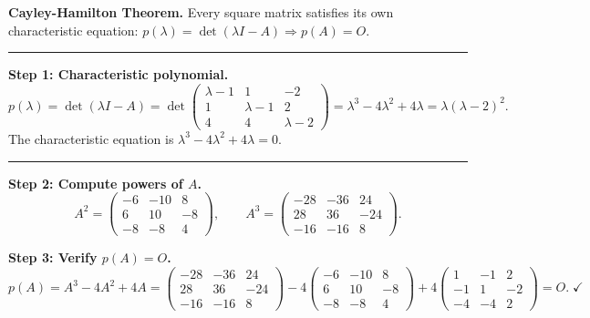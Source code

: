 \documentclass[12pt,a3paper]{article}
\begin{document}
\begin{tcolorbox}[enhanced,breakable,
  colback=cE!4,colframe=cE,boxrule=0.8pt,arc=5pt,
  title={\textbf{Answer --- Cayley-Hamilton for
    $A=\begin{pmatrix}1&-1&2\\-1&1&-2\\-4&-4&2\end{pmatrix}$}},
  fonttitle=\bfseries\color{white},colbacktitle=cE]

\textbf{Cayley-Hamilton Theorem.}
Every square matrix satisfies its own characteristic equation:
$p(\lambda) = \det(\lambda I - A) \Rightarrow p(A) = O$.

\medskip\textcolor{cE}{\rule{\textwidth}{0.4pt}}

\textbf{Step 1: Characteristic polynomial.}
\[
  p(\lambda) = \det(\lambda I - A)
  = \det\begin{pmatrix}\lambda-1&1&-2\\1&\lambda-1&2\\4&4&\lambda-2\end{pmatrix}
  = \lambda^3 - 4\lambda^2 + 4\lambda = \lambda(\lambda-2)^2.
\]
The characteristic equation is $\lambda^3 - 4\lambda^2 + 4\lambda = 0$.

\medskip\textcolor{cE}{\rule{\textwidth}{0.4pt}}

\textbf{Step 2: Compute powers of $A$.}
\[
  A^2 = \begin{pmatrix}-6&-10&8\\6&10&-8\\-8&-8&4\end{pmatrix}, \qquad
  A^3 = \begin{pmatrix}-28&-36&24\\28&36&-24\\-16&-16&8\end{pmatrix}.
\]

\textbf{Step 3: Verify $p(A) = O$.}
\[
  p(A) = A^3 - 4A^2 + 4A
  = \begin{pmatrix}-28&-36&24\\28&36&-24\\-16&-16&8\end{pmatrix}
  - 4\begin{pmatrix}-6&-10&8\\6&10&-8\\-8&-8&4\end{pmatrix}
  + 4\begin{pmatrix}1&-1&2\\-1&1&-2\\-4&-4&2\end{pmatrix}
  = O.\;\checkmark
\]


\end{tcolorbox}
\end{document}
